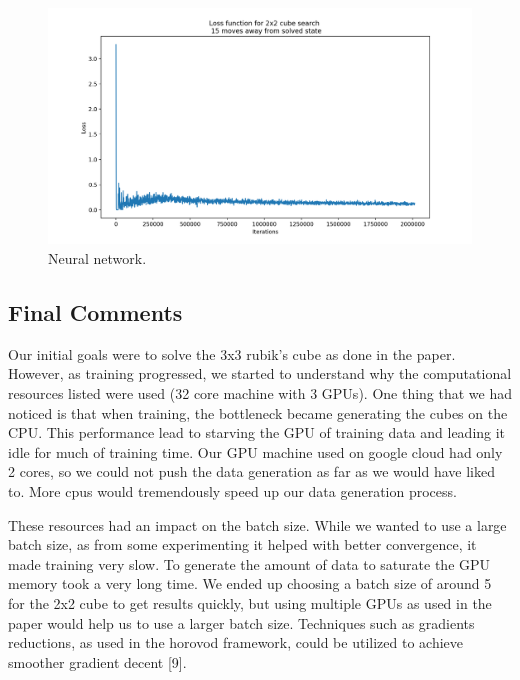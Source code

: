 \documentclass[10pt,twocolumn,letterpaper]{article}
\begin{document}
\begin{figure}
  \includegraphics[width=\linewidth]{loss.png}
  \caption{Neural network.}
  \label{fig:net}
\end{figure}

\subsection{Final Comments}

Our initial goals were to solve the 3x3 rubik's cube as done in the paper. However, as training progressed, we started to understand why the computational resources listed were used (32 core machine with 3 GPUs). One thing that we had noticed is that when training, the bottleneck became generating the cubes on the CPU. This performance lead to starving the GPU of training data and leading it idle for much of training time. Our GPU machine used on google cloud had only 2 cores, so we could not push the data generation as far as we would have liked to. More cpus would tremendously speed up our data generation process.

These resources had an impact on the batch size. While we wanted to use a large batch size, as from some experimenting it helped with better convergence, it made training very slow. To generate the amount of data to saturate the GPU memory took a very long time. We ended up choosing a batch size of around 5 for the 2x2 cube to get results quickly, but using multiple GPUs as used in the paper would help us to use a larger batch size. Techniques such as gradients reductions, as used in the horovod framework, could be utilized to achieve smoother gradient decent [9].


\end{document}

